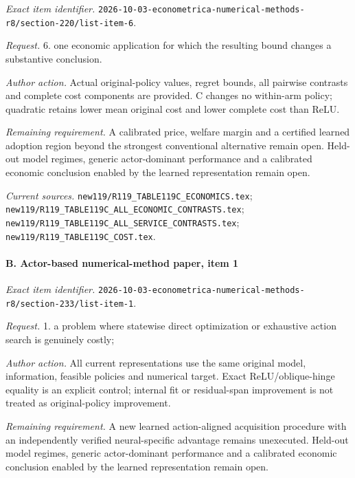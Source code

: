\emph{Exact item identifier.} \nolinkurl{2026-10-03-econometrica-numerical-methods-r8/section-220/list-item-6}.

\par\emph{Request.} 6. one economic application for which the resulting bound changes a substantive conclusion.

\par\emph{Author action.} Actual original-policy values, regret bounds, all pairwise contrasts and complete cost components are provided. C changes no within-arm policy; quadratic retains lower mean original cost and lower complete cost than ReLU.

\par\emph{Remaining requirement.} A calibrated price, welfare margin and a certified learned adoption region beyond the strongest conventional alternative remain open. Held-out model regimes, generic actor-dominant performance and a calibrated economic conclusion enabled by the learned representation remain open.

\par\emph{Current sources.} \nolinkurl{new119/R119_TABLE119C_ECONOMICS.tex}; \nolinkurl{new119/R119_TABLE119C_ALL_ECONOMIC_CONTRASTS.tex}; \nolinkurl{new119/R119_TABLE119C_ALL_SERVICE_CONTRASTS.tex}; \nolinkurl{new119/R119_TABLE119C_COST.tex}.

\paragraph{B. Actor-based numerical-method paper, item 1}

\emph{Exact item identifier.} \nolinkurl{2026-10-03-econometrica-numerical-methods-r8/section-233/list-item-1}.

\par\emph{Request.} 1. a problem where statewise direct optimization or exhaustive action search is genuinely costly;

\par\emph{Author action.} All current representations use the same original model, information, feasible policies and numerical target. Exact ReLU/\allowbreak{}oblique-hinge equality is an explicit control; internal fit or residual-span improvement is not treated as original-policy improvement.

\par\emph{Remaining requirement.} A new learned action-aligned acquisition procedure with an independently verified neural-specific advantage remains unexecuted. Held-out model regimes, generic actor-dominant performance and a calibrated economic conclusion enabled by the learned representation remain open.


